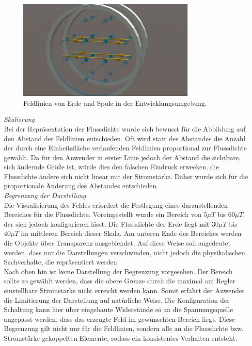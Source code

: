 \begin{figure}[h!]
	\centering
	\includegraphics[width=0.8\textwidth]{images/unity/fieldlines.jpg}
	\caption{Feldlinien von Erde und Spule in der Entwicklungsumgebung.}
	\label{img:mfield-lines}
\end{figure}

\textit{Skalierung}\\
Bei der Repräsentation der Flussdichte wurde sich bewusst für die Abbildung auf den Abstand der Feldlinien entschieden. Oft wird statt des Abstandes die Anzahl der durch eine Einheitsfläche verlaufenden Feldlinien proportional zur Flussdichte gewählt. Da für den Anwender in erster Linie jedoch der Abstand die sichtbare, sich ändernde Größe ist, würde dies den falschen Eindruck erwecken, die Flussdichte ändere sich nicht linear mit der Stromstärke. Daher wurde sich für die proportionale Änderung des Abstandes entschieden.\\

\textit{Begrenzung der Darstellung}\\
Die Visualisierung des Feldes erfordert die Festlegung eines darzustellenden Bereiches für die Flussdichte. Voreingestellt wurde ein Bereich von $5 \mu T$ bis $60 \mu T$, der sich jedoch konfigurieren lässt. Die Flussdichte der Erde liegt mit $30 \mu T$ bis $40 \mu T$ im mittleren Bereich dieser Skala. Am unteren Ende des Bereiches werden die Objekte über Transparenz ausgeblendet. Auf diese Weise soll angedeutet werden, dass nur die Darstellungen verschwinden, nicht jedoch die physikalischen Sachverhalte, die repräsentiert werden.\\
\noindent\hspace*{5mm}
Nach oben hin ist keine Darstellung der Begrenzung vorgesehen. Der Bereich sollte so gewählt werden, dass die obere Grenze durch die maximal am Regler einstellbare Stromstärke nicht erreicht werden kann. Somit erfährt der Anwender die Limitierung der Darstellung auf natürliche Weise. Die Konfiguration der Schaltung kann hier über eingebaute Widerstände so an die Spannungsquelle angepasst werden, dass das erzeugte Feld im gewünschten Bereich liegt. Diese Begrenzung gilt nicht nur für die Feldlinien, sondern alle an die Flussdichte bzw. Stromstärke gekoppelten Elemente, sodass ein konsistentes Verhalten entsteht.

